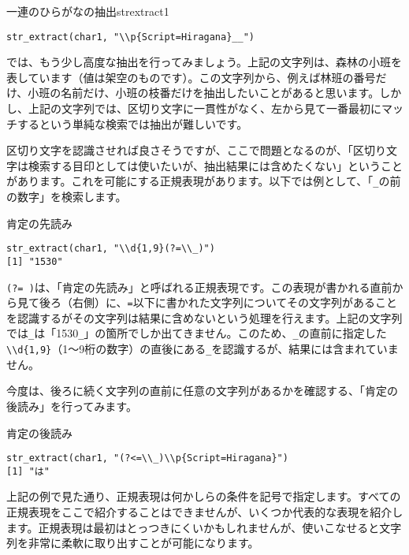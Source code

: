 \begin{exercise}{一連のひらがなの抽出}{strextract1}
\begin{verbatim}
str_extract(char1, "\\p{Script=Hiragana}__")
\end{verbatim}
\end{exercise}

では、もう少し高度な抽出を行ってみましょう。上記の文字列は、森林の小班を表しています（値は架空のものです）。この文字列から、例えば林班の番号だけ、小班の名前だけ、小班の枝番だけを抽出したいことがあると思います。しかし、上記の文字列では、区切り文字に一貫性がなく、左から見て一番最初にマッチするという単純な検索では抽出が難しいです。

区切り文字を認識させれば良さそうですが、ここで問題となるのが、「区切り文字は検索する目印としては使いたいが、抽出結果には含めたくない」ということがあります。これを可能にする正規表現があります。以下では例として、「\verb|_|の前の数字」を検索します。

\begin{itembox}[l]{肯定の先読み}
\begin{verbatim}
str_extract(char1, "\\d{1,9}(?=\\_)")
[1] "1530"
\end{verbatim}
\end{itembox}
\verb|(?= )|は、「肯定の先読み」と呼ばれる正規表現です。この表現が書かれる直前から見て後ろ（右側）に、\verb|=|以下に書かれた文字列についてその文字列があることを認識するがその文字列は結果に含めないという処理を行えます。上記の文字列では\verb|_|は「1530\verb|_|」の箇所でしか出てきません。このため、\verb|_|の直前に指定した\verb|\\d{1,9}|（1〜9桁の数字）の直後にある\verb|_|を認識するが、結果には含まれていません。

今度は、後ろに続く文字列の直前に任意の文字列があるかを確認する、「肯定の後読み」を行ってみます。
\begin{itembox}[l]{肯定の後読み}
\begin{verbatim}
str_extract(char1, "(?<=\\_)\\p{Script=Hiragana}")
[1] "は"
\end{verbatim}
\end{itembox}

上記の例で見た通り、正規表現は何かしらの条件を記号で指定します。すべての正規表現をここで紹介することはできませんが、いくつか代表的な表現を紹介します。正規表現は最初はとっつきにくいかもしれませんが、使いこなせると文字列を非常に柔軟に取り出すことが可能になります。

